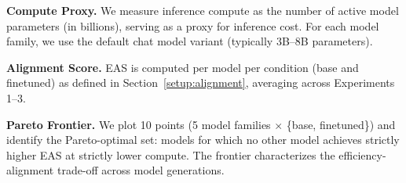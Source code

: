 \textbf{Compute Proxy.}
We measure inference compute as the number of active model parameters (in billions), serving as a proxy for inference cost. For each model family, we use the default chat model variant (typically 3B--8B parameters).

\textbf{Alignment Score.}
EAS is computed per model per condition (base and finetuned) as defined in Section~\ref{setup:alignment}, averaging across Experiments 1--3.

\textbf{Pareto Frontier.}
We plot 10 points (5 model families $\times$ \{base, finetuned\}) and identify the Pareto-optimal set: models for which no other model achieves strictly higher EAS at strictly lower compute. The frontier characterizes the efficiency-alignment trade-off across model generations.
